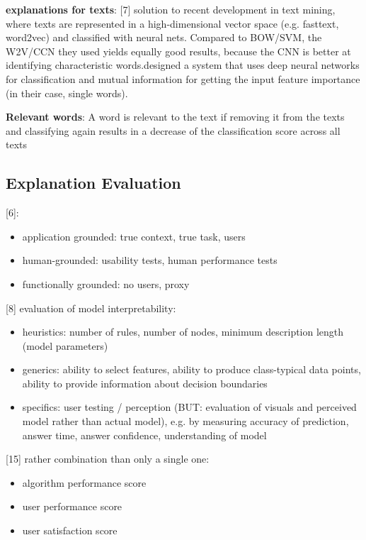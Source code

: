 \textbf{explanations for texts}:
[7] solution to recent development in text mining, where texts are represented in a high-dimensional vector space (e.g. fasttext, word2vec) and classified with neural nets. Compared to BOW/SVM, the W2V/CCN they used yields equally good results, because the CNN is better at identifying characteristic words.\newline
[19] designed a system that uses deep neural networks for classification and mutual information for getting the input feature importance (in their case, single words). \newline

\textbf{Relevant words}: A word is relevant to the text if removing it from the texts and classifying again results in a decrease of the classification score across all texts







\subsection{Explanation Evaluation}
[6]:
\begin{itemize}
	\item application grounded: true context, true task, users
	\item human-grounded: usability tests, human performance tests
	\item functionally grounded: no users, proxy
\end{itemize}
[8] evaluation of model interpretability:
\begin{itemize}
	\item heuristics: number of rules, number of nodes, minimum description length (model parameters)
	\item generics: ability to select features, ability to produce class-typical data points, ability to provide information about decision boundaries
	\item specifics: user testing / perception (BUT: evaluation of visuals and perceived model rather than actual model), e.g. by measuring accuracy of prediction, answer time, answer confidence, understanding of model
\end{itemize}
[15] rather combination than only a single one:
\begin{itemize}
	\item algorithm performance score
	\item user performance score
	\item user satisfaction score 
\end{itemize}







